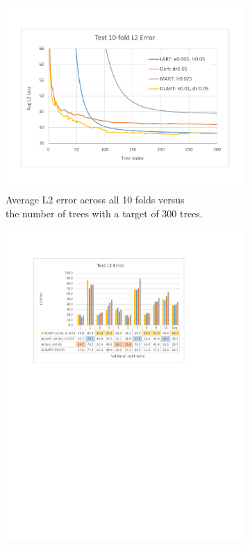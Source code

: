 \documentclass{article} %
\begin{document}
\begin{figure}	\centering
	
\begin{subfigure}{.49\textwidth}
\includegraphics[trim={1.5cm 2cm 1.5cm 2cm},clip, scale = 0.28]{laplaceTree.pdf}
\caption{Average L2 error across all 10 folds versus\\ the number of trees  with a target of 300 trees. \label{fig:compareA}}
\end{subfigure}
\begin{subfigure}{.49\textwidth}
\includegraphics[trim={2cm 15.5cm 5cm 2.1cm},clip, scale = 0.478]{barTable.pdf}

\end{subfigure}
\end{figure}
\end{document}
